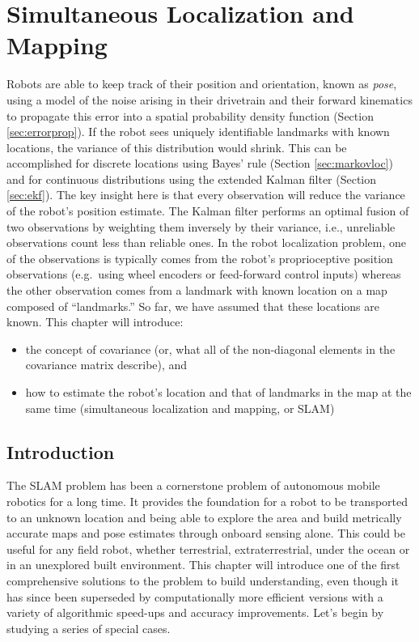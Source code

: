 \chapter{Simultaneous Localization and Mapping}\label{chap:slam}
Robots are able to keep track of their position and orientation, known as \emph{pose}, using a model of the noise arising in their drivetrain and their forward kinematics to propagate this error into a spatial probability density function (Section \ref{sec:errorprop}). If the robot sees uniquely identifiable landmarks with known locations, the variance of this distribution would shrink. This can be accomplished for discrete locations using Bayes' rule (Section \ref{sec:markovloc}) and for continuous distributions using the extended Kalman filter (Section \ref{sec:ekf}). The key insight here is that every observation will reduce the variance of the robot's position estimate. The Kalman filter performs an optimal fusion of two observations by weighting them inversely by their variance, i.e., unreliable observations count less than reliable ones. In the robot localization problem, one of the observations is typically comes from the robot's proprioceptive position observations (e.g.\ using wheel encoders or feed-forward control inputs) whereas the other observation comes from a landmark with known location on a map composed of ``landmarks.'' So far, we have assumed that these locations are known. This chapter will introduce:

\begin{itemize}
\item the concept of covariance (or, what all of the non-diagonal elements in the covariance matrix describe), and
\item how to estimate the robot's location and that of landmarks in the map at the same time (simultaneous localization and mapping, or SLAM)
\end{itemize}

\section{Introduction}
The SLAM problem has been a cornerstone problem of autonomous mobile robotics for a long time. It provides the foundation for a robot to be transported to an unknown location and being able to explore the area and build metrically accurate maps and pose estimates through onboard sensing alone. This could be useful for any field robot, whether terrestrial, extraterrestrial, under the ocean or in an unexplored built environment. This chapter will introduce one of the first comprehensive solutions to the problem to build understanding, even though it has since been superseded by computationally more efficient versions with a variety of algorithmic speed-ups and accuracy improvements. Let's begin by studying a series of special cases.

